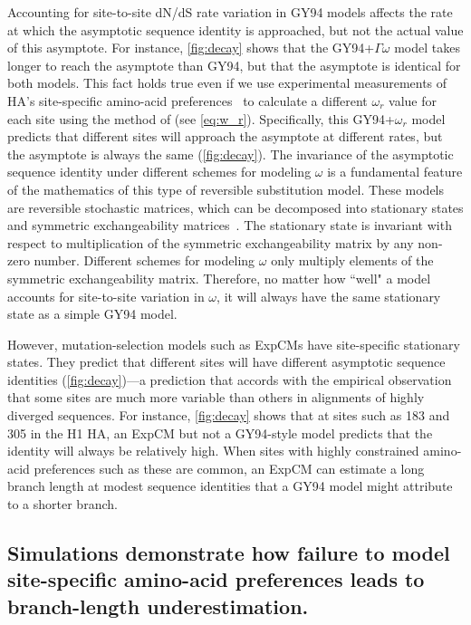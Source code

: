 \documentclass[11pt]{article}
\begin{document}
Accounting for site-to-site dN/dS rate variation in GY94 models affects the rate at which the asymptotic sequence identity is approached, but not the actual value of this asymptote.
For instance, \ref{fig:decay} shows that the GY94+$\Gamma\omega$ model takes longer to reach the asymptote than GY94, but that the asymptote is identical for both models. 
This fact holds true even if we use experimental measurements of HA's site-specific amino-acid preferences~\citep{doud2016accurate} to calculate a different $\omega_r$ value for each site using the method of \citet{spielman2015relationship} (see \ref{eq:w_r}).
Specifically, this GY94+$\omega_r$ model predicts that different sites will approach the asymptote at different rates, but the asymptote is always the same (\ref{fig:decay}).
The invariance of the asymptotic sequence identity under different schemes for modeling $\omega$ is a fundamental feature of the mathematics of this type of reversible substitution model.
These models are reversible stochastic matrices, which can be decomposed into stationary states and symmetric exchangeability matrices~\citep{nielsen2006statistical}.
The stationary state is invariant with respect to multiplication of the symmetric exchangeability matrix by any non-zero number.
Different schemes for modeling $\omega$ only multiply elements of the symmetric exchangeability matrix.
Therefore, no matter how ``well" a model accounts for site-to-site variation in $\omega$, it will always have the same stationary state as a simple GY94 model. 

However, mutation-selection models such as ExpCMs have site-specific stationary states.
They predict that different sites will have different asymptotic sequence identities (\ref{fig:decay})---a prediction that accords with the empirical observation that some sites are much more variable than others in alignments of highly diverged sequences.
For instance, \ref{fig:decay} shows that at sites such as 183 and 305 in the H1 HA, an ExpCM but not a GY94-style model predicts that the identity will always be relatively high. 
When sites with highly constrained amino-acid preferences such as these are common, an ExpCM can estimate a long branch length at modest sequence identities that a GY94 model might attribute to a shorter branch.


\subsection*{Simulations demonstrate how failure to model site-specific amino-acid preferences leads to branch-length underestimation.}
\end{document}
